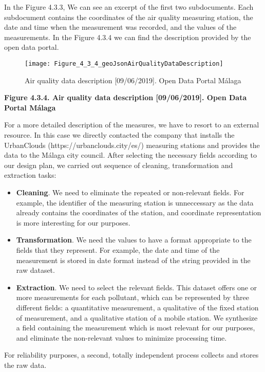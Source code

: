 In the Figure 4.3.3, We can see an excerpt of the first two subdocuments.
Each subdocument contains the coordinates of the air quality measuring station, the date and time when the measurement was recorded, and the values of the measurements.
In the Figure 4.3.4 we can find the description provided by the open data portal.\\
    
\begin{figure}[ht]
    \centering
    \texttt{[image: Figure\_4\_3\_4\_geoJsonAirQualityDataDescription]}
    \caption{Air quality data description [09/06/2019]. Open Data Portal Málaga}
\end{figure}
\begin{center}
    \bf{        
    Figure 4.3.4. Air quality data description [09/06/2019]. Open Data Portal Málaga}
\end{center}

For a more detailed description of the measures, we have to resort to an external resource.
In this case we directly contacted the company that installs the UrbanClouds (https://urbanclouds.city/es/) measuring stations and provides the data to the Málaga city council.
After selecting the necessary fields according to our design plan, we carried out sequence of cleaning, transformation and extraction tasks:

\begin{itemize}
    \item \textbf{Cleaning}. We need to eliminate the repeated or non-relevant fields.
        For example, the identifier of the measuring station is unneccessary as the data already contains the coordinates of the station, and coordinate representation is more interesting for our purposes.

    \item \textbf{Transformation}. We need the values to have a format appropriate to the fields that they represent.
        For example, the date and time of the measurement is stored in date format instead of the string provided in the raw dataset.

    \item \textbf{Extraction}. We need to select the relevant fields.
        This dataset offers one or more measurements for each pollutant, which can be represented by three different fields:
        a quantitative measurement, a qualitative of the fixed station of measurement, and a qualitative station of a mobile station.
        We synthesize a field containing the measurement which is most relevant for our purposes, and eliminate the non-relevant values to minimize processing time.
\end{itemize}

For reliability purposes, a second, totally independent process collects and stores the raw data.
